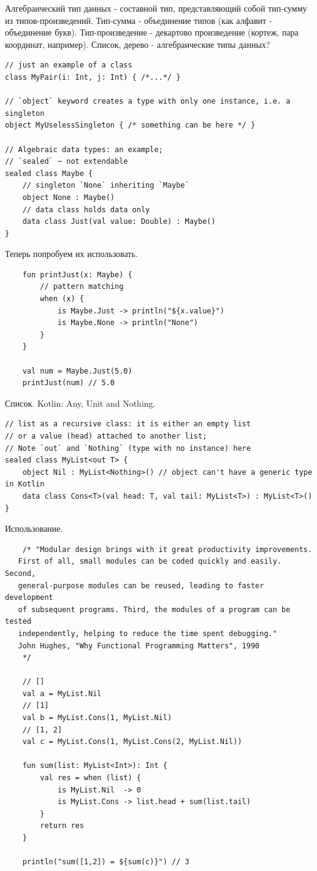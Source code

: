 \documentclass{book}
\begin{document}
Алгебраический тип данных - составной тип, представляющий собой тип-сумму из типов-произведений.
Тип-сумма - объединение типов (как алфавит - объединение букв). Тип-произведение - декартово
произведение (кортеж, пара координат, например). Список, дерево - алгебраические типы данных?

\begin{verbatim}
// just an example of a class
class MyPair(i: Int, j: Int) { /*...*/ }

// `object` keyword creates a type with only one instance, i.e. a singleton
object MyUselessSingleton { /* something can be here */ }

// Algebraic data types: an example;
// `sealed` ~ not extendable
sealed class Maybe {
    // singleton `None` inheriting `Maybe`
    object None : Maybe()
    // data class holds data only
    data class Just(val value: Double) : Maybe()
}
\end{verbatim}

Теперь попробуем их использовать.

\begin{verbatim}
    fun printJust(x: Maybe) {
        // pattern matching
        when (x) {
            is Maybe.Just -> println("${x.value}")
            is Maybe.None -> println("None")
        }
    }

    val num = Maybe.Just(5.0)
    printJust(num) // 5.0
\end{verbatim}

Список. Kotlin: Any, Unit and Nothing.
\begin{verbatim}
// list as a recursive class: it is either an empty list
// or a value (head) attached to another list;
// Note `out` and `Nothing` (type with no instance) here
sealed class MyList<out T> {
    object Nil : MyList<Nothing>() // object can't have a generic type in Kotlin
    data class Cons<T>(val head: T, val tail: MyList<T>) : MyList<T>()
}
\end{verbatim}

Использование.
\begin{verbatim}
    /* "Modular design brings with it great productivity improvements.
   First of all, small modules can be coded quickly and easily. Second,
   general-purpose modules can be reused, leading to faster development
   of subsequent programs. Third, the modules of a program can be tested
   independently, helping to reduce the time spent debugging."
   John Hughes, "Why Functional Programming Matters", 1990
    */

    // []
    val a = MyList.Nil
    // [1]
    val b = MyList.Cons(1, MyList.Nil)
    // [1, 2]
    val c = MyList.Cons(1, MyList.Cons(2, MyList.Nil))

    fun sum(list: MyList<Int>): Int {
        val res = when (list) {
            is MyList.Nil  -> 0
            is MyList.Cons -> list.head + sum(list.tail)
        }
        return res
    }

    println("sum([1,2]) = ${sum(c)}") // 3
\end{verbatim}
\end{document}

